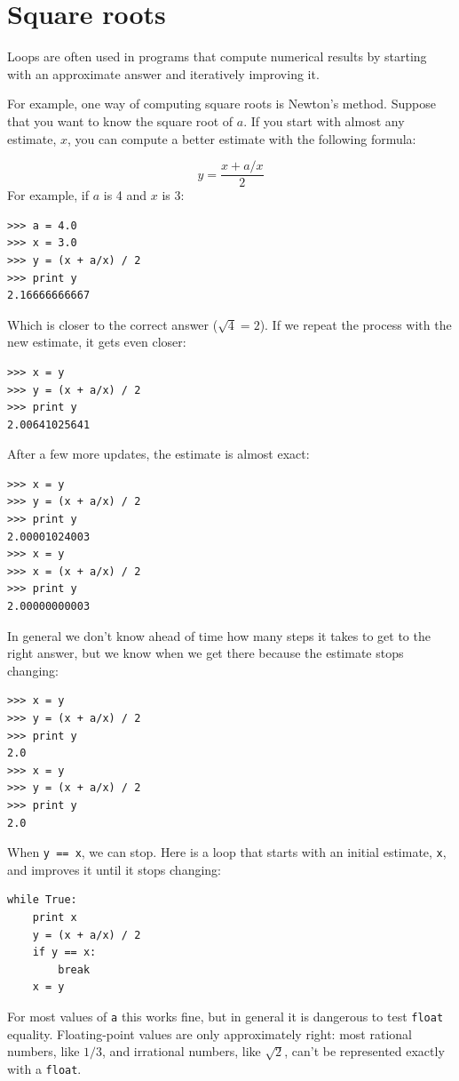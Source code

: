 \documentclass[10pt]{book}
\begin{document}
\section{Square roots}


Loops are often used in programs that compute
numerical results by starting with an approximate answer and
iteratively improving it.


For example, one way of computing square roots is Newton's method.
Suppose that you want to know the square root of $a$.  If you start
with almost any estimate, $x$, you can compute a better
estimate with the following formula:

\[ y = \frac{x + a/x}{2} \]
%
For example, if $a$ is 4 and $x$ is 3:

\beforeverb
\begin{verbatim}
>>> a = 4.0
>>> x = 3.0
>>> y = (x + a/x) / 2
>>> print y
2.16666666667
\end{verbatim}
\afterverb
%
Which is closer to the correct answer ($\sqrt{4} = 2$).  If we
repeat the process with the new estimate, it gets even closer:

\beforeverb
\begin{verbatim}
>>> x = y
>>> y = (x + a/x) / 2
>>> print y
2.00641025641
\end{verbatim}
\afterverb
%
After a few more updates, the estimate is almost exact:


\beforeverb
\begin{verbatim}
>>> x = y
>>> y = (x + a/x) / 2
>>> print y
2.00001024003
>>> x = y
>>> x = (x + a/x) / 2
>>> print y
2.00000000003
\end{verbatim}
\afterverb
%
In general we don't know ahead of time how many steps it takes
to get to the right answer, but we know when we get there
because the estimate
stops changing:

\beforeverb
\begin{verbatim}
>>> x = y
>>> y = (x + a/x) / 2
>>> print y
2.0
>>> x = y
>>> y = (x + a/x) / 2
>>> print y
2.0
\end{verbatim}
\afterverb
%
When {\tt y == x}, we can stop.  Here is a loop that starts
with an initial estimate, {\tt x}, and improves it until it
stops changing:

\beforeverb
\begin{verbatim}
while True:
    print x
    y = (x + a/x) / 2
    if y == x:
        break
    x = y
\end{verbatim}
\afterverb
%
For most values of {\tt a} this works fine, but in general it is
dangerous to test {\tt float} equality.
Floating-point values are only approximately right:
most rational numbers, like $1/3$, and irrational numbers, like
$\sqrt{2}$, can't be represented exactly with a {\tt float}.
\end{document}
